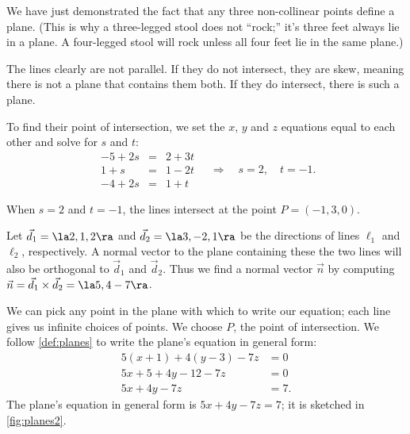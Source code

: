 We have just demonstrated the fact that any three non-collinear points define a plane. (This is why a three-legged stool does not ``rock;'' it's three feet always lie in a plane. A four-legged stool will rock unless all four feet lie in the same plane.)

{The lines clearly are not parallel. If they do not intersect, they are skew, meaning there is not a plane that contains them both. If they do intersect, there is such a plane. 

To find their point of intersection, we set the $x$, $y$ and $z$ equations equal to each other and solve for $s$ and $t$:
$$\begin{array}{ccc}
-5+2s &=&2+3t \\ 1+s &=& 1-2t \\ -4+2s &=& 1+t \end{array}\quad  \Rightarrow  \quad s=2,\quad t=-1.$$

When $s=2$ and $t=-1$, the lines intersect at the point $P= (-1,3,0)$. 

Let $\vec d_1 = \la 2,1,2\ra$ and $\vec d_2=\la 3,-2,1\ra$ be the directions of lines $\ell_1$ and $\ell_2$, respectively. A normal vector to the plane containing these the two lines will also be orthogonal to $\vec d_1$ and $\vec d_2$. Thus we find a normal vector $\vec n$ by computing $\vec n = \vec d_1 \times \vec d_2= \la 5,4-7\ra$.

We can pick any point in the plane with which to write our equation; each line gives us infinite choices of points. We choose $P$, the point of intersection. We follow \autoref{def:planes} to write the plane's equation in general form:
\begin{align*}
5(x+1) +4(y-3) -7z &= 0 \\
5x + 5 + 4y-12 -7z &= 0\\
5x+4y-7z &= 7.
\end{align*}
The plane's equation in general form is $5x+4y-7z=7$; it is sketched in \autoref{fig:planes2}.
}

